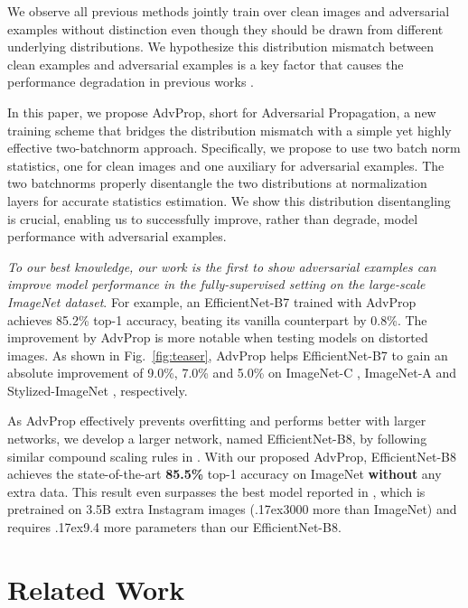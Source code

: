 \documentclass[10pt,twocolumn,letterpaper]{article}
\newcommand{\app}{\raise.17ex\hbox{}}
\begin{document}
We observe  all previous methods jointly train over clean images and adversarial examples without distinction even though they should be drawn from different underlying distributions. We hypothesize  this distribution mismatch between clean examples and adversarial examples is a key factor that causes the performance degradation in previous works \cite{Kannan2018,Kurakin2017,Xie2019}.


In this paper, we propose AdvProp, short for Adversarial Propagation, a new training scheme that bridges the distribution mismatch with a simple yet highly effective two-batchnorm approach. Specifically, we propose to use two batch norm statistics, one for clean images and one auxiliary for adversarial examples. The two batchnorms properly disentangle the two distributions at normalization layers for accurate statistics estimation. We show this distribution disentangling is crucial, enabling us to successfully improve, rather than degrade, model performance with adversarial examples.


\emph{To our best knowledge, our work is the first to show adversarial examples can improve model performance in the fully-supervised setting on the large-scale ImageNet dataset}. For example, an EfficientNet-B7 \cite{Tan2019} trained with AdvProp achieves 85.2\% top-1 accuracy, beating its vanilla counterpart by 0.8\%. The improvement by AdvProp is more notable when testing models on distorted images. As shown in Fig.~\ref{fig:teaser}, AdvProp helps EfficientNet-B7 to gain an absolute improvement of 9.0\%, 7.0\% and 5.0\% on ImageNet-C \cite{Hendrycks2018}, ImageNet-A \cite{Hendrycks2019b} and Stylized-ImageNet \cite{Geirhos2018}, respectively. 


As AdvProp effectively prevents overfitting and performs better with larger networks, we develop a larger network, named EfficientNet-B8, by following similar compound scaling rules in \cite{Tan2019}. With our proposed AdvProp, EfficientNet-B8 achieves the state-of-the-art \textbf{85.5\%} top-1 accuracy on ImageNet \textbf{without} any extra data. This result even surpasses the best model reported in \cite{Mahajan2018}, which is pretrained on 3.5B extra Instagram images (\app 3000 more than ImageNet) and requires \app 9.4 more parameters than our EfficientNet-B8.


\section{Related Work}
\end{document}
